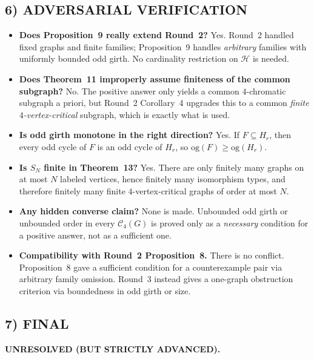 \subsection*{6) ADVERSARIAL VERIFICATION}
\begin{itemize}
\item \textbf{Does Proposition~9 really extend Round~2?} Yes. Round~2 handled fixed graphs and finite families; Proposition~9 handles \emph{arbitrary} families with uniformly bounded odd girth. No cardinality restriction on $\mathcal H$ is needed.

\item \textbf{Does Theorem~11 improperly assume finiteness of the common subgraph?} No. The positive answer only yields a common $4$-chromatic subgraph a priori, but Round~2 Corollary~4 upgrades this to a common \emph{finite $4$-vertex-critical} subgraph, which is exactly what is used.

\item \textbf{Is odd girth monotone in the right direction?} Yes. If $F\subseteq H_r$, then every odd cycle of $F$ is an odd cycle of $H_r$, so $\mathrm{og}(F)\ge \mathrm{og}(H_r)$.

\item \textbf{Is $S_N$ finite in Theorem~13?} Yes. There are only finitely many graphs on at most $N$ labeled vertices, hence finitely many isomorphism types, and therefore finitely many finite $4$-vertex-critical graphs of order at most $N$.

\item \textbf{Any hidden converse claim?} None is made. Unbounded odd girth or unbounded order in every $\mathcal C_4(G)$ is proved only as a \emph{necessary} condition for a positive answer, not as a sufficient one.

\item \textbf{Compatibility with Round~2 Proposition~8.} There is no conflict. Proposition~8 gave a sufficient condition for a counterexample pair via arbitrary family omission. Round~3 instead gives a one-graph obstruction criterion via boundedness in odd girth or size.
\end{itemize}

\subsection*{7) FINAL}
\textbf{UNRESOLVED (BUT STRICTLY ADVANCED).}

